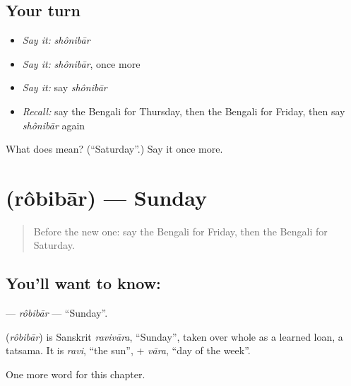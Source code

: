 \subsection*{Your turn}
\begin{itemize}
\raggedright
  \item \emph{Say it:} \emph{shônibār}
  \item \emph{Say it:} \emph{shônibār}, once more
  \item \emph{Say it:} say \emph{shônibār}
  \item \emph{Recall:} say the Bengali for Thursday, then the Bengali for Friday, then say \emph{shônibār} again
\end{itemize}

\begin{tcolorbox}[breakable,colback=teal!4,colframe=teal!35!black,title={Before you move on}]
What does  mean? (\textquotedblleft{}Saturday\textquotedblright{}.) Say it once more.
\end{tcolorbox}
\section[\texorpdfstring{\bn{রবিবার} (rôbibār)}{রবিবার (rôbibār)}]{ (rôbibār) — Sunday}

\label{lesson:BN-C92-robibar}



\begin{quote}
Before the new one: say the Bengali for Friday, then the Bengali for Saturday.
\end{quote}

\subsection*{You'll want to know: }
\textbf{} — \emph{rôbibār} — \textquotedblleft{}Sunday\textquotedblright{}.

\begin{cousinweb}
\textbf{} (\emph{rôbibār}) is Sanskrit \emph{ravivāra}, \textquotedblleft{}Sunday\textquotedblright{}, taken over whole as a learned loan, a tatsama. It is \emph{ravi}, \textquotedblleft{}the sun\textquotedblright{}, + \emph{vāra}, \textquotedblleft{}day of the week\textquotedblright{}.
\end{cousinweb}

\begin{grammarlens}[title={What you've built}]
One more word for this chapter.
\end{grammarlens}

